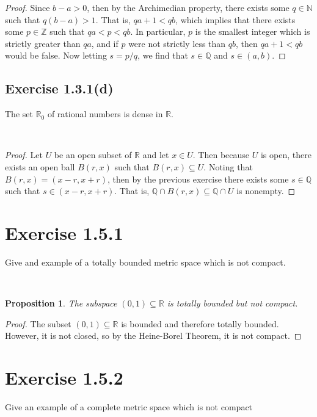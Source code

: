 \documentclass[12pt]{article}
\newcommand{\N}{\mathbb{N}}
\newcommand{\Z}{\mathbb{Z}}
\newcommand{\R}{\mathbb{R}}
\newcommand{\Q}{\mathbb{Q}}
\newenvironment{problem}
    {\begin{lrbox}{\mybox}\begin{minipage}{\textwidth-10pt}}
    {\end{minipage}\end{lrbox}\framebox[6.5in]{\usebox{\mybox}}\\}
\newtheorem{proposition}{Proposition}
\begin{document}
\begin{proof}
    Since $b-a>0$, then by the Archimedian property, there exists some $q\in\N$ such that $q(b-a)>1$. That is, $qa + 1 < qb$, which implies that there exists some $p\in\Z$ such that $qa<p<qb$. In particular, $p$ is the smallest integer which is strictly greater than $qa$, and if $p$ were not strictly less than $qb$, then $qa + 1 < qb$ would be false. Now letting $s=p/q$, we find that $s\in\Q$ and $s\in(a,b)$.
    
\end{proof}

\subsection*{Exercise 1.3.1(d)}
\begin{problem}
    The set $\R_0$ of rational numbers is dense in $\R$.
\end{problem}

\begin{proof}
    Let $U$ be an open subset of $\R$ and let $x\in U$. Then because $U$ is open, there exists an open ball $B(r,x)$ such that $B(r,x)\subseteq U$. Noting that $B(r,x)=(x-r,x+r)$, then by the previous exercise there exists some $s\in\Q$ such that $s\in(x-r,x+r)$. That is, $\Q\cap B(r,x)\subseteq \Q\cap U$ is nonempty.
    
\end{proof}

\section*{Exercise 1.5.1}
\begin{problem}
    Give and example of a totally bounded metric space which is not compact.
\end{problem}

\begin{proposition}
    The subspace $(0,1)\subseteq\R$ is totally bounded but not compact. 
\end{proposition}

\begin{proof}
    The subset $(0,1)\subseteq\R$ is bounded and therefore totally bounded. However, it is not closed, so by the Heine-Borel Theorem, it is not compact.
    
\end{proof}

\section*{Exercise 1.5.2}
\begin{problem}
    Give an example of a complete metric space which is not compact
\end{problem}
\end{document}
